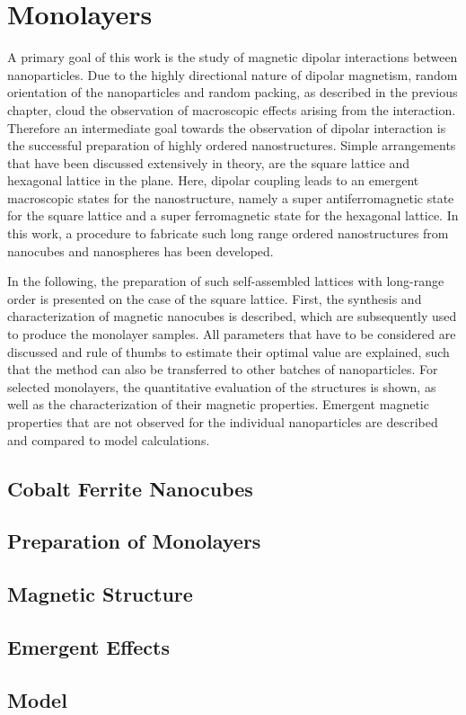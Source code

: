 \documentclass[\main/dresen_thesis.tex]{subfiles}
\renewcommand{\thisPath}{\main/chapters/monolayers}
\begin{document}
  \chapter{Monolayers}\label{ch:monolayers}
    A primary goal of this work is the study of magnetic dipolar interactions between nanoparticles.
    Due to the highly directional nature of dipolar magnetism, random orientation of the nanoparticles and random packing, as described in the previous chapter, cloud the observation of macroscopic effects arising from the interaction.
    Therefore an intermediate goal towards the observation of dipolar interaction is the successful preparation of highly ordered nanostructures.
    Simple arrangements that have been discussed extensively in theory, are the square lattice and hexagonal lattice in the plane.
    Here, dipolar coupling leads to an emergent macroscopic states for the nanostructure, namely a super antiferromagnetic state for the square lattice and a super ferromagnetic state for the hexagonal lattice.
    In this work, a procedure to fabricate such long range ordered nanostructures from nanocubes and nanospheres has been developed.

    In the following, the preparation of such self-assembled lattices with long-range order is presented on the case of the square lattice.
    First, the synthesis and characterization of magnetic nanocubes is described, which are subsequently used to produce the monolayer samples.
    All parameters that have to be considered are discussed and rule of thumbs to estimate their optimal value are explained, such that the method can also be transferred to other batches of nanoparticles.
    For selected monolayers, the quantitative evaluation of the structures is shown, as well as the characterization of their magnetic properties. Emergent magnetic properties that are not observed for the individual nanoparticles are described and compared to model calculations.

    \section{Cobalt Ferrite Nanocubes}
      

    \FloatBarrier
    \section{Preparation of Monolayers}
      

    \FloatBarrier
    \section{Magnetic Structure}
      

    \section{Emergent Effects}

    \section{Model}
\end{document}
